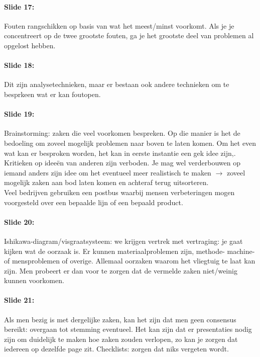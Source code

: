 \documentclass[10pt,a4paper]{report}
\begin{document}
\paragraph{Slide 17:} Fouten rangschikken op basis van wat het meest/minst voorkomt. Als je je concentreert op de twee grootste fouten, ga je het grootste deel van problemen al opgelost hebben.

\paragraph{Slide 18:} Dit zijn analysetechnieken, maar er bestaan ook andere technieken om te besprkeen wat er kan foutopen.

\paragraph{Slide 19:} Brainstorming: zaken die veel voorkomen bespreken. Op die manier is het de bedoeling om zoveel mogelijk problemen naar boven te laten komen. Om het even wat kan er besproken worden, het kan in eerste instantie een gek idee zijn,.\\
Kritieken op idee\"en van anderen zijn verboden. Je mag wel verderbouwen op iemand anders zijn idee om het eventueel meer realistisch te maken $\rightarrow$ zoveel mogelijk zaken aan bod laten komen en achteraf terug uitsorteren.\\
Veel bedrijven gebruiken een postbus waarbij mensen verbeteringen mogen voorgesteld over een bepaalde lijn of een bepaald product. 

\paragraph{Slide 20:} Ishikawa-diagram/visgraatsysteem: we krijgen vertrek met vertraging: je gaat kijken wat de oorzaak is. Er kunnen materiaalproblemen zijn, methode- machine- of mensproblemen of overige. Allemaal oorzaken waarom het vliegtuig te laat kan zijn. Men probeert er dan voor te zorgen dat de vermelde zaken niet/weinig kunnen voorkomen.

\paragraph{Slide 21:} Als men bezig is met dergelijke zaken, kan het zijn dat men geen consensus bereikt: overgaan tot stemming eventueel. Het kan zijn dat er presentaties nodig zijn om duidelijk te maken hoe zaken zouden verlopen, zo kan je zorgen dat iedereen op dezelfde page zit.
Checklists: zorgen dat niks vergeten wordt.
\end{document}

